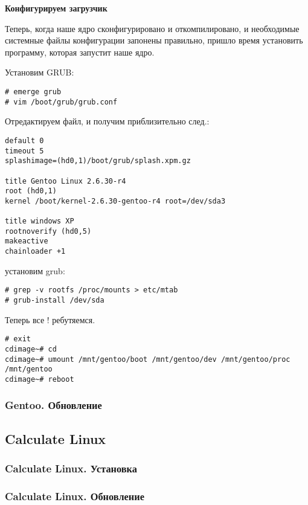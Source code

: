 \documentclass[12pt, a4paper]{article}
\begin{document}
{\bf Конфигурируем загрузчик}

Теперь, когда наше ядро сконфигурировано и откомпилировано, и необходимые системные файлы конфигурации запонены правильно, пришло время установить программу, которая запустит наше ядро.

Установим GRUB:

\begin{verbatim}
# emerge grub
# vim /boot/grub/grub.conf
\end{verbatim}

Отредактируем файл, и получим приблизительно след.:

\begin{verbatim}
default 0
timeout 5
splashimage=(hd0,1)/boot/grub/splash.xpm.gz

title Gentoo Linux 2.6.30-r4
root (hd0,1)
kernel /boot/kernel-2.6.30-gentoo-r4 root=/dev/sda3

title windows XP
rootnoverify (hd0,5)
makeactive
chainloader +1
\end{verbatim}

установим grub:

\begin{verbatim}
# grep -v rootfs /proc/mounts > etc/mtab
# grub-install /dev/sda 
\end{verbatim}

Теперь все ! ребутяемся.

\begin{verbatim}
# exit 
cdimage~# cd 
cdimage~# umount /mnt/gentoo/boot /mnt/gentoo/dev /mnt/gentoo/proc /mnt/gentoo
cdimage~# reboot

\end{verbatim}



\subsubsection{Gentoo. Обновление}

\subsection{Calculate Linux}

\subsubsection{Calculate Linux. Установка}
\subsubsection{Calculate Linux. Обновление}
\end{document}
